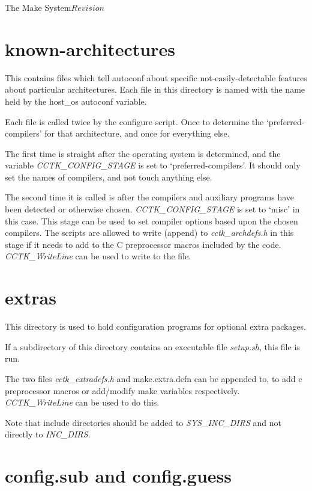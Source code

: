 \begin{cactuspart}{3}{The Make System}{}{$Revision$}
\section{known-architectures}
\label{sec:autoconf:knownarch}

This contains files which tell autoconf about specific not-easily-detectable
features about particular architectures.  Each file in this directory is
named with the name held by the host\_os autoconf variable.

Each file is called twice by the configure script.  Once to determine
the `preferred-compilers' for that architecture, and once for
everything else.

The first time is straight after the operating system is 
determined, and the variable {\em CCTK\_CONFIG\_STAGE} is set to
`preferred-compilers'.  It should only set the names of compilers,
and not touch anything else.  

The second time it is called is after the compilers and
auxiliary programs have been detected or otherwise chosen. 
{\em CCTK\_CONFIG\_STAGE} is set to `misc' in this case.  This stage
can be used to set compiler options based upon the chosen compilers.
The scripts are allowed to write (append) to {\em cctk\_archdefs.h} in
this stage if it needs to add to the C preprocessor macros included
by the code.  {\em CCTK\_WriteLine} can be used to write to the
file.

\section{extras}
\label{sec:autoconf:extras}

This directory is used to hold configuration programs for optional
extra packages.

If a subdirectory of this directory contains an executable file 
{\em setup.sh}, this file is run.

The two files {\em cctk\_extradefs.h} and {make.extra.defn} can be appended
to, to add c preprocessor macros or add/modify make variables respectively.
{\em CCTK\_WriteLine} can be used to do this.  

Note that include directories should be added to {\em SYS\_INC\_DIRS} and not
directly to {\em INC\_DIRS}.

\section{config.sub and config.guess}
\label{sec:autoconf:subguess}


\end{cactuspart}
